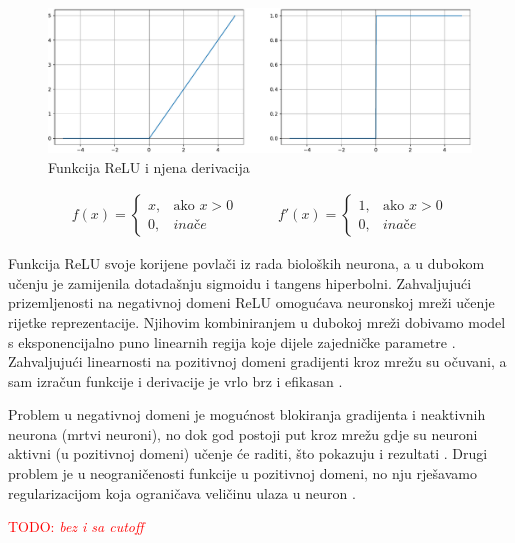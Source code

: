 \documentclass[times, utf8, diplomski]{fer}
\def\otherwise{\textit{inače}}
\def\TODO#1{\noindent\textcolor{red}{TODO: \textit{#1}}\newline}
\def\todo#1{\TODO{#1}}
\begin{document}
\begin{figure}[H]
\includegraphics[width=\textwidth]{ReLU.pdf}
\centering
\caption{Funkcija ReLU i njena derivacija}
\label{fig:relu}
\end{figure}

\begin{equation}
\label{eq:relu}
\begin{split}
f(x) = 
\begin{cases}
x,		& \text{ako } x > 0 \\
0,		& \otherwise
\end{cases}
\end{split}
\qquad
\begin{split}
f'(x) = 
\begin{cases}
1,		& \text{ako } x > 0 \\
0,		& \otherwise
\end{cases}
\end{split}
\end{equation}

Funkcija ReLU svoje korijene povlači iz rada bioloških neurona, a u dubokom učenju je zamijenila dotadašnju sigmoidu i tangens hiperbolni. Zahvaljujući prizemljenosti na negativnoj domeni ReLU omogućava neuronskoj mreži učenje rijetke reprezentacije. Njihovim kombiniranjem u dubokoj mreži dobivamo model s eksponencijalno puno linearnih regija koje dijele zajedničke parametre \citep{relu_rbm}. Zahvaljujući linearnosti na pozitivnoj domeni gradijenti kroz mrežu su očuvani, a sam izračun funkcije i derivacije je vrlo brz i efikasan \citep{relu}.

Problem u negativnoj domeni je mogućnost blokiranja gradijenta i neaktivnih neurona (mrtvi neuroni), no dok god postoji put kroz mrežu gdje su neuroni aktivni (u pozitivnoj domeni) učenje će raditi, što pokazuju i rezultati \citep{relu}. Drugi problem je u neograničenosti funkcije u pozitivnoj domeni, no nju rješavamo regularizacijom koja ograničava veličinu ulaza u neuron \citep{relu}.

\todo{bez i sa cutoff}
\end{document}
